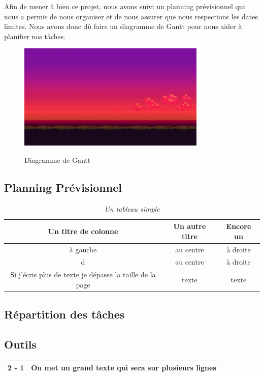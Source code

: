 \documentclass[12pt,a4paper, twoside]{article}
\begin{document}
    Afin de mener à bien ce projet, nous avons suivi un planning prévisionnel qui nous a permis de nous organiser et de nous assurer que nous respections les dates limites. Nous avons donc dû faire un diagramme de Gantt pour nous aider à planifier nos tâches.
    \begin{figure}[h]
        \centering
        \includegraphics[width=0.8\textwidth]{../../assets/Title Screen/BG.jpg}
        \label{fig:GANTT}
        \caption{Diagramme de Gantt}
    \end{figure}
\subsection{Planning Prévisionnel}
\begin{table}[h]
    \centering
    \begin{tabular}{|c|c|c|}
        \hline
        Un titre de colonne & Un autre titre & Encore un \\
        \hline
        à gauche & au centre & à droite \\
        \hline
        d & au centre & à droite \\
        \hline
        Si j’écris plus de texte je dépasse la taille de la page & texte & texte \\
        \hline
    \end{tabular}
    \vspace{1cm}
    \caption{\emph{Un tableau simple}}
    \label{tab:test}
\end{table}

\subsection{Répartition des tâches}
\subsection{Outils}
\newpage
\begin{center}
\begin{tabular}{|c|p{8cm}|}
\hline
2 - 1 & On met un grand texte qui sera sur plusieurs lignes \\
\hline
\end{tabular}
\end{center}
\end{document}
